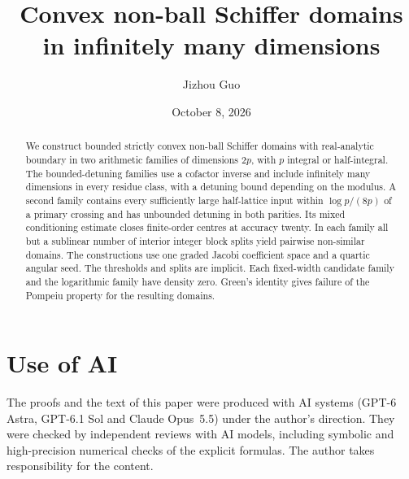 \documentclass[11pt]{amsart}
\title{Convex non-ball Schiffer domains in infinitely many dimensions}
\author{Jizhou Guo}
\date{October 8, 2026}
\theoremstyle{definition}
\theoremstyle{remark}
\numberwithin{equation}{section}
\begin{document}
\begin{abstract}
We construct bounded strictly convex non-ball Schiffer domains with
real-analytic boundary in two arithmetic families of dimensions $2p$,
with $p$ integral or half-integral. The bounded-detuning families use
a cofactor inverse and include infinitely many dimensions in every
residue class, with a detuning bound depending on the modulus. A second family
contains every sufficiently large half-lattice input within
$\log p/(8p)$ of a primary crossing and has unbounded detuning in both
parities. Its mixed conditioning estimate closes finite-order centres
at accuracy twenty. In each family all but a sublinear number of
interior integer block splits yield pairwise non-similar domains.
The constructions use one graded Jacobi coefficient space and a quartic
angular seed. The thresholds and splits are implicit. Each fixed-width
candidate family and the logarithmic family have density zero.
Green's identity gives failure
of the Pompeiu property for the resulting domains.
\end{abstract}
\maketitle
\tableofcontents






















\appendix



\section*{Use of AI}
The proofs and the text of this paper were produced with AI systems
(GPT-6 Astra, GPT-6.1 Sol and Claude Opus~5.5) under the author's
direction. They were checked by independent reviews with AI models,
including symbolic and high-precision numerical checks of the explicit
formulas. The author takes responsibility for the content.


\end{document}
